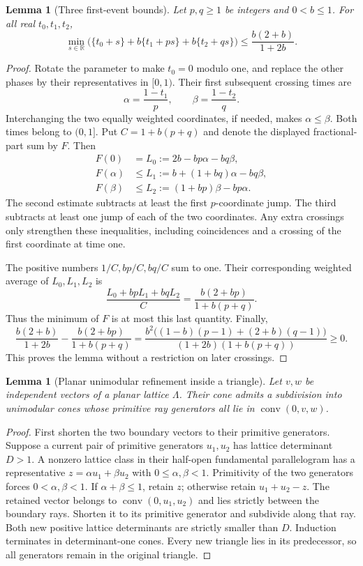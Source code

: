 \documentclass[11pt,a4paper]{article}
\newtheorem{lemma}[theorem]{Lemma}
\theoremstyle{remark}\newtheorem{remark}[theorem]{Remark}
\begin{document}
\begin{lemma}[Three first-event bounds]
\label{r4w:lem-first-events}
Let $p,q\ge1$ be integers and $0<b\le1$. For all real $t_0,t_1,t_2$,
\[
 \min_{s\in\mathbb R}
 \bigl(\{t_0+s\}+b\{t_1+ps\}+b\{t_2+qs\}\bigr)
 \le \frac{b(2+b)}{1+2b}.
\]
\end{lemma}
\begin{proof}
Rotate the parameter to make $t_0=0$ modulo one, and replace the other
phases by their representatives in $[0,1)$. Their first subsequent
crossing times are
\[
 \alpha=\frac{1-t_1}{p},\qquad
 \beta=\frac{1-t_2}{q}.
\]
Interchanging the two equally weighted coordinates, if needed, makes
$\alpha\le\beta$. Both times belong to $(0,1]$. Put
$C=1+b(p+q)$ and denote the displayed fractional-part sum by $F$.
Then
\begin{align*}
 F(0)&=L_0:=2b-bp\alpha-bq\beta,\\
 F(\alpha)&\le L_1:=b+(1+bq)\alpha-bq\beta,\\
 F(\beta)&\le L_2:=(1+bp)\beta-bp\alpha.
\end{align*}
The second estimate subtracts at least the first $p$-coordinate jump.
The third subtracts at least one jump of each of the two coordinates.
Any extra crossings only strengthen these inequalities, including
coincidences and a crossing of the first coordinate at time one.

The positive numbers $1/C,bp/C,bq/C$ sum to one. Their corresponding
weighted average of $L_0,L_1,L_2$ is
\[
 \frac{L_0+bpL_1+bqL_2}{C}
 =\frac{b(2+bp)}{1+b(p+q)}.
\]
Thus the minimum of $F$ is at most this last quantity. Finally,
\[
 \frac{b(2+b)}{1+2b}
 -\frac{b(2+bp)}{1+b(p+q)}
 =\frac{b^2\bigl((1-b)(p-1)+(2+b)(q-1)\bigr)}
 {(1+2b)(1+b(p+q))}\ge0.
\]
This proves the lemma without a restriction on later crossings.
\end{proof}

\begin{lemma}[Planar unimodular refinement inside a triangle]
\label{r4w:lem-fan}
Let $v,w$ be independent vectors of a planar lattice $\Lambda$.
Their cone admits a subdivision into unimodular cones whose primitive
ray generators all lie in $\operatorname{conv}(0,v,w)$.
\end{lemma}
\begin{proof}
First shorten the two boundary vectors to their primitive generators.
Suppose a current pair of primitive generators $u_1,u_2$ has lattice
determinant $D>1$. A nonzero lattice class in their half-open
fundamental parallelogram has a representative
$z=\alpha u_1+\beta u_2$ with $0\le\alpha,\beta<1$.
Primitivity of the two generators forces $0<\alpha,\beta<1$.
If $\alpha+\beta\le1$, retain $z$; otherwise retain $u_1+u_2-z$.
The retained vector belongs to $\operatorname{conv}(0,u_1,u_2)$
and lies strictly between the boundary rays. Shorten it to its
primitive generator and subdivide along that ray.
Both new positive lattice determinants are strictly smaller than $D$.
Induction terminates in determinant-one cones. Every new triangle
lies in its predecessor, so all generators remain in the original
triangle.
\end{proof}
\end{document}
